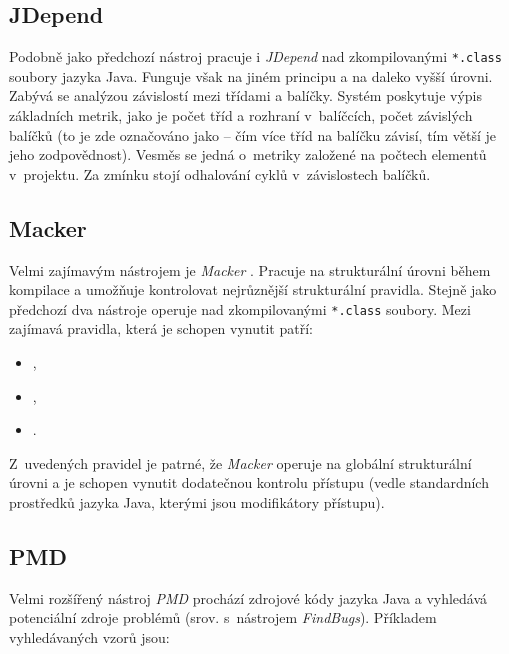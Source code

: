 \subsection{JDepend}
Podobně jako předchozí nástroj pracuje i \emph{JDepend} \cite{existingtools:jdepend} nad zkompilovanými \verb+*.class+ soubory jazyka Java. Funguje však na jiném principu a na daleko vyšší úrovni. Zabývá se analýzou závislostí mezi třídami a balíčky. Systém poskytuje výpis základních metrik, jako je počet tříd a rozhraní v~balíčcích, počet závislých balíčků (to je zde označováno jako  -- čím více tříd na balíčku závisí, tím větší je jeho zodpovědnost). Vesměs se jedná o~metriky založené na počtech elementů v~projektu. Za zmínku stojí odhalování cyklů v~závislostech balíčků.

\subsection{Macker}
Velmi zajímavým nástrojem je \emph{Macker} \cite{existingtools:macker}. Pracuje na strukturální úrovni během kompilace a umožňuje kontrolovat nejrůznější strukturální pravidla. Stejně jako předchozí dva nástroje operuje nad zkompilovanými \verb+*.class+ soubory. Mezi zajímavá pravidla, která je schopen vynutit patří:

\begin{itemize}
\item {},
\item {},
\item {}.
\end{itemize}

Z~uvedených pravidel je patrné, že \emph{Macker} operuje na globální strukturální úrovni a je schopen vynutit dodatečnou kontrolu přístupu (vedle standardních prostředků jazyka Java, kterými jsou modifikátory přístupu).

\subsection{PMD}
Velmi rozšířený nástroj \emph{PMD} \cite{existingtools:pmd} prochází zdrojové kódy jazyka Java a vyhledává potenciální zdroje problémů (srov. s~nástrojem \emph{FindBugs}). Příkladem vyhledávaných vzorů jsou:

